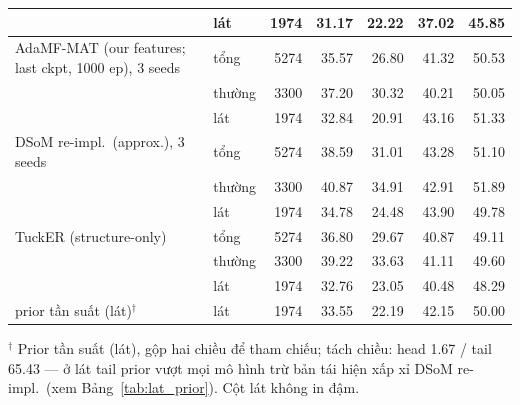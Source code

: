 \begin{table}[t]
\begin{tabular}{l l r r r r r}
 & lát & 1974 & 31.17 & 22.22 & 37.02 & 45.85 \\
\midrule
AdaMF-MAT (our features; last ckpt, 1000 ep), 3 seeds & tổng & 5274 & 35.57 & 26.80 & 41.32 & 50.53 \\
 & thường & 3300 & 37.20 & 30.32 & 40.21 & 50.05 \\
 & lát & 1974 & 32.84 & 20.91 & 43.16 & 51.33 \\
\midrule
DSoM re-impl.\ (approx.), 3 seeds & tổng & 5274 & 38.59 & 31.01 & 43.28 & 51.10 \\
 & thường & 3300 & 40.87 & 34.91 & 42.91 & 51.89 \\
 & lát & 1974 & 34.78 & 24.48 & 43.90 & 49.78 \\
\midrule
TuckER (structure-only) & tổng & 5274 & 36.80 & 29.67 & 40.87 & 49.11 \\
 & thường & 3300 & 39.22 & 33.63 & 41.11 & 49.60 \\
 & lát & 1974 & 32.76 & 23.05 & 40.48 & 48.29 \\
\midrule
prior tần suất (lát)$^\dagger$ & lát & 1974 & 33.55 & 22.19 & 42.15 & 50.00 \\
\bottomrule
\end{tabular}
\vspace{2pt}
\begin{minipage}{\linewidth}\footnotesize\raggedright
$^\dagger$ Prior tần suất (lát), gộp hai chiều để tham chiếu; tách chiều: head 1.67 / tail 65.43 --- ở lát tail prior vượt mọi mô hình trừ bản tái hiện xấp xỉ DSoM re-impl.\ (xem Bảng~\ref{tab:lat_prior}). Cột lát không in đậm.
\end{minipage}
\end{table}

